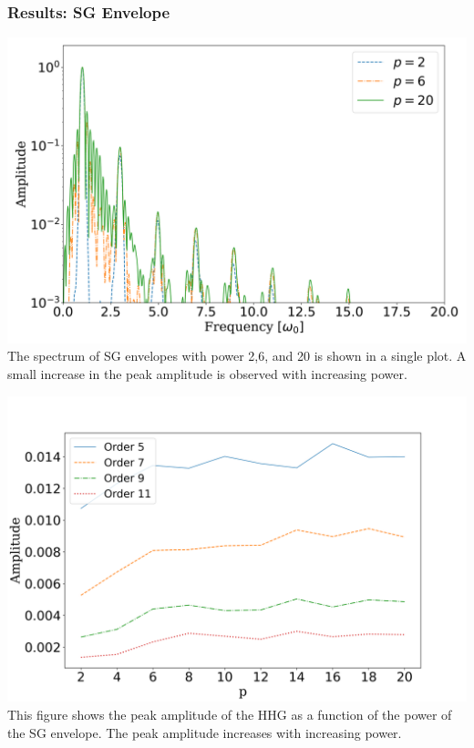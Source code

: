 \documentclass{beamer}
\begin{document}
\begin{frame}
    \frametitle{Results: SG Envelope}
    \begin{minipage}[h]{0.48\linewidth}
        \centering
        \includegraphics[width=1\textwidth, height=0.60\textheight]{images/SG_ffts_2-6-20.png}
        \scriptsize{The spectrum of SG envelopes with power 2,6, and 20 is shown in a single plot. A small increase in the peak amplitude is observed with increasing power.}
        \label{fig:sg-fft}
    \end{minipage}
    \begin{minipage}[h]{0.48\linewidth}
        \centering
        \includegraphics[width=1\textwidth, height=0.60\textheight]{images/SG_peak_amplitude.png}
        \scriptsize{This figure shows the peak amplitude of the HHG as a function of the power of the SG envelope. The peak amplitude increases with increasing power.}
        \label{fig:sg-peak}
    \end{minipage}
\end{frame}
\end{document}

